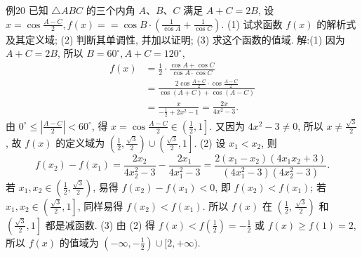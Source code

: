 例20 已知 $\triangle A B C$ 的三个内角 $A 、 B 、 C$ 满足 $A+C=2 B$, 设 $x= \cos \frac{A-C}{2}, f(x)==\cos B \cdot\left(\frac{1}{\cos A}+\frac{1}{\cos C}\right)$.
(1) 试求函数 $f(x)$ 的解析式及其定义域;
(2) 判断其单调性, 并加以证明;
(3) 求这个函数的值域.
解:(1) 因为 $A+C=2 B$, 所以 $B=60^{\circ}, A+C=120^{\circ}$,
$$
\begin{aligned}
f(x) & =\frac{1}{2} \cdot \frac{\cos A+\cos C}{\cos A \cdot \cos C} \\
& =\frac{2 \cos \frac{A+C}{2} \cdot \cos \frac{A-C}{2}}{\cos (A+C)+\cos (A-C)} \\
& =\frac{x}{-\frac{1}{2}+2 x^2-1}=\frac{2 x}{4 x^2-3} .
\end{aligned}
$$
由 $0^{\circ} \leqslant\left|\frac{A-C}{2}\right|<60^{\circ}$, 得 $x=\cos \frac{A-C}{2} \in\left(\frac{1}{2}, 1\right]$.
又因为 $4 x^2-3 \neq 0$, 所以 $x \neq \frac{\sqrt{3}}{2}$, 故 $f(x)$ 的定义域为 $\left(\frac{1}{2}, \frac{\sqrt{3}}{2}\right) \cup \left(\frac{\sqrt{3}}{2}, 1\right]$.
(2) 设 $x_1<x_2$, 则
$$
f\left(x_2\right)-f\left(x_1\right)=\frac{2 x_2}{4 x_2^2-3}-\frac{2 x_1}{4 x_1^2-3}=\frac{2\left(x_1-x_2\right)\left(4 x_1 x_2+3\right)}{\left(4 x_1^2-3\right)\left(4 x_2^2-3\right)} .
$$
若 $x_1, x_2 \in\left(\frac{1}{2}, \frac{\sqrt{3}}{2}\right)$, 易得 $f\left(x_2\right)-f\left(x_1\right)<0$, 即 $f\left(x_2\right)<f\left(x_1\right)$;
若 $x_1, x_2 \in\left(\frac{\sqrt{3}}{2}, 1\right]$, 同样易得 $f\left(x_2\right)<f\left(x_1\right)$. 所以 $f(x)$ 在 $\left(\frac{1}{2}\right.$, $\left.\frac{\sqrt{3}}{2}\right)$ 和 $\left(\frac{\sqrt{3}}{2}, 1\right]$ 都是减函数.
(3) 由 (2) 得 $f(x)<f\left(\frac{1}{2}\right)=-\frac{1}{2}$ 或 $f(x) \geqslant f(1)=2$, 所以 $f(x)$ 的值域为 $\left(-\infty,-\frac{1}{2}\right) \cup[2,+\infty)$.


